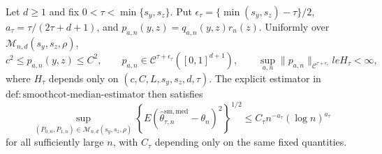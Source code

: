 Let \(d\ge1\) and fix \(0<\tau<\min\{s_y,s_z\}\). Put \(\epsilon_\tau=\{\min(s_y,s_z)-\tau\}/2\), \(a_\tau=\tau/(2\tau+d+1)\), and \(p_{a,n}(y,z)=q_{a,n}(y,z)r_n(z)\). Uniformly over \(\mathcal M_{n,d}(s_y,s_z,\rho)\),
\[
c^2\le p_{a,n}(y,z)\le C^2,
\qquad
p_{a,n}\in\mathcal C^{\tau+\epsilon_\tau}([0,1]^{d+1}),
\qquad
\sup_{a,n}\|p_{a,n}\|_{\mathcal C^{\tau+\epsilon_\tau}}le H_\tau<\infty,
\]
where \(H_\tau\) depends only on \((c,C,L,s_y,s_z,d,\tau)\). The explicit estimator in \(\mathrm{def{:}smoothcot\text{-}median\text{-}estimator}\) then satisfies
\[
\sup_{(P_{0,n},P_{1,n})\in\mathcal M_{n,d}(s_y,s_z,\rho)}
\left\{E(\widehat\theta^{\mathrm{sm,med}}_{\tau,n}-\theta_n)^2\right\}^{1/2}
\le C_\tau n^{-a_\tau}(\log n)^{a_\tau}
\]
for all sufficiently large \(n\), with \(C_\tau\) depending only on the same fixed quantities.